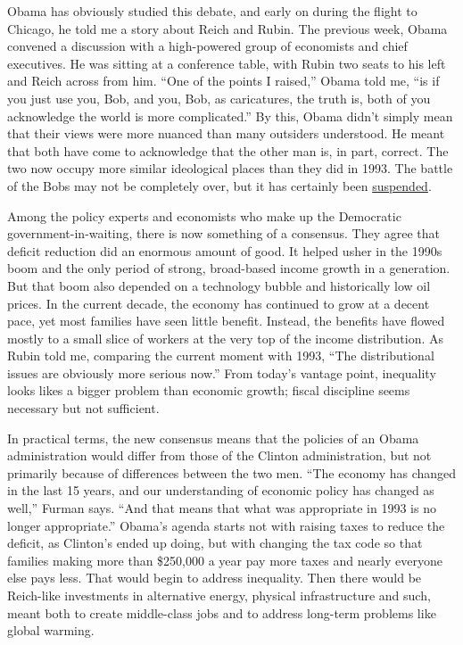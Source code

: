 Obama has obviously studied this debate, and early on during the flight
to Chicago, he told me a story about Reich and Rubin. The previous week,
Obama convened a discussion with a high-powered group of economists and
chief executives. He was sitting at a conference table, with Rubin two
seats to his left and Reich across from him. ``One of the points I
raised,'' Obama told me, ``is if you just use you, Bob, and you, Bob, as
caricatures, the truth is, both of you acknowledge the world is more
complicated.'' By this, Obama didn't simply mean that their views were
more nuanced than many outsiders understood. He meant that both have
come to acknowledge that the other man is, in part, correct. The two now
occupy more similar ideological places than they did in 1993. The battle
of the Bobs may not be completely over, but it has certainly been
\href{http://www.nytimes.com/2007/06/10/magazine/10wwln-summers-t.html}{suspended}.

Among the policy experts and economists who make up the Democratic
government-in-waiting, there is now something of a consensus. They agree
that deficit reduction did an enormous amount of good. It helped usher
in the 1990s boom and the only period of strong, broad-based income
growth in a generation. But that boom also depended on a technology
bubble and historically low oil prices. In the current decade, the
economy has continued to grow at a decent pace, yet most families have
seen little benefit. Instead, the benefits have flowed mostly to a small
slice of workers at the very top of the income distribution. As Rubin
told me, comparing the current moment with 1993, ``The distributional
issues are obviously more serious now.'' From today's vantage point,
inequality looks likes a bigger problem than economic growth; fiscal
discipline seems necessary but not sufficient.

In practical terms, the new consensus means that the policies of an
Obama administration would differ from those of the Clinton
administration, but not primarily because of differences between the two
men. ``The economy has changed in the last 15 years, and our
understanding of economic policy has changed as well,'' Furman says.
``And that means that what was appropriate in 1993 is no longer
appropriate.'' Obama's agenda starts not with raising taxes to reduce
the deficit, as Clinton's ended up doing, but with changing the tax code
so that families making more than \$250,000 a year pay more taxes and
nearly everyone else pays less. That would begin to address inequality.
Then there would be Reich-like investments in alternative energy,
physical infrastructure and such, meant both to create middle-class jobs
and to address long-term problems like global warming.


